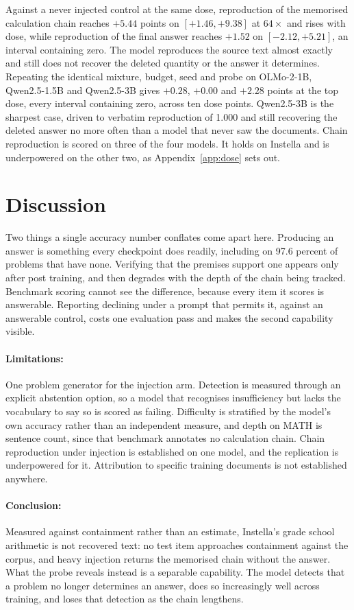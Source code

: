 \documentclass{article}
\begin{document}
Against a never injected control at the same dose, reproduction of the memorised calculation
chain reaches $+5.44$ points on $[+1.46, +9.38]$ at $64\times$ and rises with
dose, while reproduction of the final answer reaches $+1.52$ on $[-2.12, +5.21]$, an interval
containing zero. The model reproduces the source text almost exactly and still does not
recover the deleted quantity or the answer it determines. Repeating the identical mixture,
budget, seed and probe on OLMo-2-1B, Qwen2.5-1.5B and Qwen2.5-3B gives $+0.28$, $+0.00$ and
$+2.28$ points at the top dose, every interval containing zero, across ten dose points.
Qwen2.5-3B is the sharpest case, driven to verbatim reproduction of 1.000 and still
recovering the deleted answer no more often than a model that never saw the documents. Chain
reproduction is scored on three of the four models. It holds on Instella and is underpowered
on the other two, as Appendix~\ref{app:dose} sets out.

\section{Discussion}

Two things a single accuracy number conflates come apart here. Producing an answer is
something every checkpoint does readily, including on 97.6 percent of problems that have
none. Verifying that the premises support one appears only after post training, and then
degrades with the depth of the chain being tracked. Benchmark scoring cannot see the difference, because every item it scores is
answerable. Reporting declining under a prompt that permits it, against an answerable
control, costs one evaluation pass and makes the second capability visible.

\paragraph{Limitations:} One problem generator for the injection arm. Detection is
measured through an explicit abstention option, so a model that recognises insufficiency but
lacks the vocabulary to say so is scored as failing. Difficulty is stratified by the model's own
accuracy rather than an independent measure, and depth on MATH is sentence count, since that
benchmark annotates no calculation chain. Chain reproduction under injection is established on one model, and the
replication is underpowered for it. Attribution to specific training documents is not
established anywhere.

\paragraph{Conclusion:} Measured against containment rather than an estimate, Instella's
grade school arithmetic is not recovered text: no test item approaches containment against
the corpus, and heavy injection returns the memorised chain without the answer. What the
probe reveals instead is a separable capability. The model detects that a problem no longer
determines an answer, does so increasingly well across training, and loses that detection as
the chain lengthens.
\end{document}
